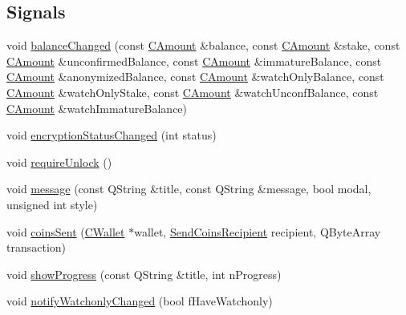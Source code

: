 \subsection*{Signals}
\begin{DoxyCompactItemize}
\item 
void \hyperlink{class_wallet_model_a2d604bd45656b6e405232ba84203fa14}{balance\+Changed} (const \hyperlink{amount_8h_a4eaf3a5239714d8c45b851527f7cb564}{C\+Amount} \&balance, const \hyperlink{amount_8h_a4eaf3a5239714d8c45b851527f7cb564}{C\+Amount} \&stake, const \hyperlink{amount_8h_a4eaf3a5239714d8c45b851527f7cb564}{C\+Amount} \&unconfirmed\+Balance, const \hyperlink{amount_8h_a4eaf3a5239714d8c45b851527f7cb564}{C\+Amount} \&immature\+Balance, const \hyperlink{amount_8h_a4eaf3a5239714d8c45b851527f7cb564}{C\+Amount} \&anonymized\+Balance, const \hyperlink{amount_8h_a4eaf3a5239714d8c45b851527f7cb564}{C\+Amount} \&watch\+Only\+Balance, const \hyperlink{amount_8h_a4eaf3a5239714d8c45b851527f7cb564}{C\+Amount} \&watch\+Only\+Stake, const \hyperlink{amount_8h_a4eaf3a5239714d8c45b851527f7cb564}{C\+Amount} \&watch\+Unconf\+Balance, const \hyperlink{amount_8h_a4eaf3a5239714d8c45b851527f7cb564}{C\+Amount} \&watch\+Immature\+Balance)
\item 
void \hyperlink{class_wallet_model_a4fc1b30b795f66ebed3e48db3a489876}{encryption\+Status\+Changed} (int status)
\item 
void \hyperlink{class_wallet_model_acc639a99e4aa34f32110f6b2bdef2393}{require\+Unlock} ()
\item 
void \hyperlink{class_wallet_model_aa6570b47336267f37b4491a6f18a2a96}{message} (const Q\+String \&title, const Q\+String \&message, bool modal, unsigned int style)
\item 
void \hyperlink{class_wallet_model_ad625ad874bc4155e9300c222040eef66}{coins\+Sent} (\hyperlink{class_c_wallet}{C\+Wallet} $\ast$wallet, \hyperlink{class_send_coins_recipient}{Send\+Coins\+Recipient} recipient, Q\+Byte\+Array transaction)
\item 
void \hyperlink{class_wallet_model_a6c445e6ea25889e14542762e54ced44f}{show\+Progress} (const Q\+String \&title, int n\+Progress)
\item 
void \hyperlink{class_wallet_model_a6568a470db58549d57c0ccf5d6b0d997}{notify\+Watchonly\+Changed} (bool f\+Have\+Watchonly)
\end{DoxyCompactItemize}
